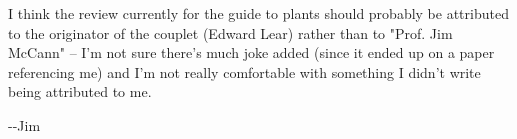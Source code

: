 \documentclass[12pt]{sigbovik-review}
\author{\textless ix@tchow.com\textgreater}
\begin{document}
\maketitle

I think the review currently for the guide to plants should probably be attributed to the originator of the couplet (Edward Lear) rather than to "Prof. Jim McCann" -- I'm not sure there's much joke added (since it ended up on a paper referencing me) and I'm not really comfortable with something I didn't write being attributed to me.

-{}-Jim
\end{document}
